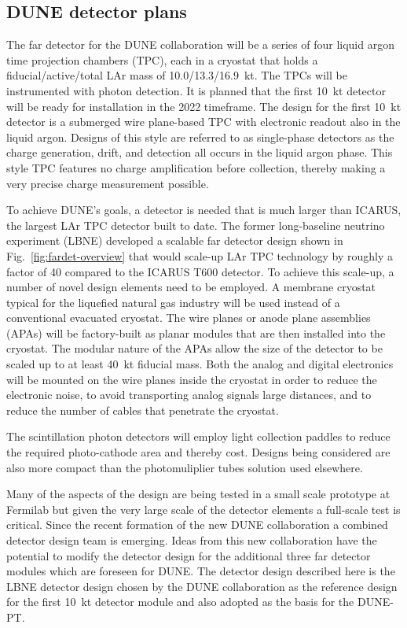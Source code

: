 \label{singlephasedet}

\subsection{DUNE detector plans}

The far detector for the DUNE collaboration will be a series of four liquid argon time projection chambers (TPC), each in a cryostat that holds a fiducial/active/total LAr mass of 10.0/13.3/16.9~kt. The TPCs will be instrumented with photon detection. It is planned that the first 10~kt detector will be ready for installation in the 2022 timeframe. 
The design for the first 10~kt detector is a submerged wire plane-based TPC with electronic readout also in the liquid argon.  Designs of this style are referred to as single-phase detectors as the charge generation, drift, and detection all occurs in the liquid argon phase.  This style TPC features no charge amplification before collection, thereby making a very precise charge measurement possible. 


To achieve DUNE's goals, a detector is needed that is much larger than ICARUS, the largest LAr TPC detector built to date. The former long-baseline neutrino experiment (LBNE) developed a scalable far detector design shown in Fig.~\ref{fig:fardet-overview} that would scale-up LAr TPC technology by roughly a factor of 40 compared to the ICARUS T600 detector. To achieve this scale-up, a number of novel design elements need to be employed. A membrane cryostat typical for the liquefied natural gas industry will be used instead of a conventional evacuated cryostat.  The wire planes or anode plane assemblies (APAs) will be factory-built as planar modules that are then installed into the cryostat. The modular nature of the APAs allow the size of the detector to be scaled up to at least 40~kt fiducial mass. Both the analog and digital electronics will be mounted on the wire planes inside the cryostat in order to reduce the electronic noise, to avoid transporting analog signals large distances, and to reduce the number of cables that penetrate the cryostat. 

The scintillation photon detectors will employ light collection paddles to reduce the required photo-cathode area and thereby cost.  Designs being considered are also more compact than the photomuliplier tubes solution used elsewhere.

Many of the aspects of the design are being tested in a small scale prototype at Fermilab but given the very large scale of the detector elements a full-scale test is critical. 
Since the recent formation of the new DUNE collaboration a combined detector design team is emerging. 
Ideas from this new collaboration have the potential to modify the detector design for the additional three far detector modules
which are foreseen for DUNE.
The detector design described here is the LBNE detector design chosen by the DUNE collaboration as the reference design for the first 10~kt 
detector module and also adopted as the basis for the DUNE-PT.


